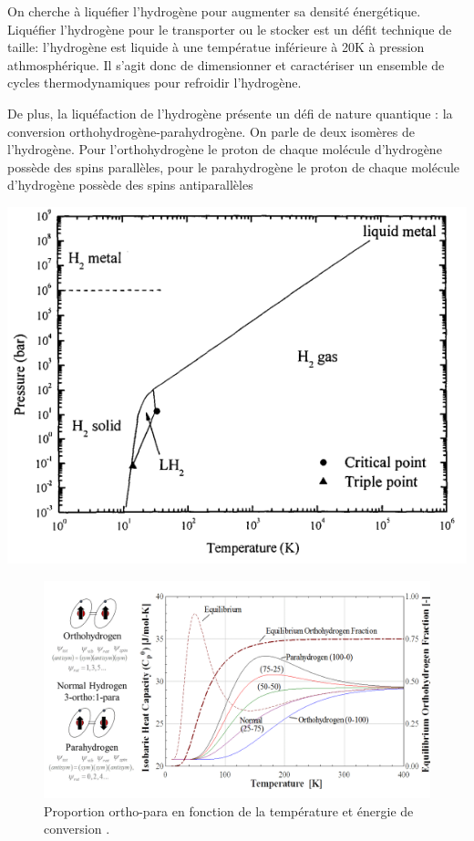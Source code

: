 \documentclass[11pt,french,a4paper]{article}
\begin{document}
\begin{multicols}{2}
On cherche à liquéfier l'hydrogène pour augmenter sa densité énergétique. Liquéfier l'hydrogène pour le transporter ou le stocker est un défit technique de taille: l'hydrogène est liquide à une températue inférieure à 20K à pression athmosphérique. Il s'agit donc de dimensionner et caractériser un ensemble de cycles thermodynamiques pour refroidir l'hydrogène. 

De plus, la liquéfaction de l'hydrogène présente un défi de nature quantique : la conversion orthohydrogène-parahydrogène. On parle de deux isomères de l'hydrogène. Pour l'orthohydrogène le proton de chaque molécule d'hydrogène possède des spins parallèles, pour le parahydrogène le proton de chaque molécule d'hydrogène possède des spins antiparallèles


\begin{center}
  \includegraphics[width=\linewidth]{image/chap3/diagramme de phase H2.png}
\end{center}

\end{multicols}

\begin{figure}[!h]
  \centering
  \includegraphics[width=0.6\linewidth]{image/chap3/Ortho-para.png}
 \caption{Proportion ortho-para en fonction de la température et énergie de conversion \cite{orthopara}.}
\end{figure}
\end{document}
